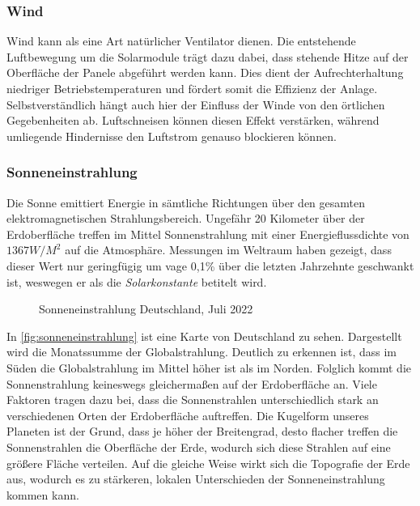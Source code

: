 \documentclass[12pt, a4paper]{article}
\begin{document}
\subsubsection{Wind}

Wind kann als eine Art natürlicher Ventilator dienen. Die entstehende Luftbewegung um die Solarmodule trägt dazu dabei, dass stehende Hitze auf der Oberfläche der Panele abgeführt werden kann. Dies dient der Aufrechterhaltung niedriger Betriebstemperaturen und fördert somit die Effizienz der Anlage. Selbstverständlich hängt auch hier der Einfluss der Winde von den örtlichen Gegebenheiten ab. Luftschneisen können diesen Effekt verstärken, während umliegende Hindernisse den Luftstrom genauso blockieren können.

\subsubsection{Sonneneinstrahlung}

Die Sonne emittiert Energie in sämtliche Richtungen über den gesamten elektromagnetischen Strahlungsbereich. Ungefähr 20 Kilometer über der Erdoberfläche treffen im Mittel Sonnenstrahlung mit einer Energieflussdichte von $1367 W/M^2$ auf die Atmosphäre. Messungen im Weltraum haben gezeigt, dass dieser Wert nur geringfügig um vage 0,1\% über die letzten Jahrzehnte geschwankt ist, weswegen er als die \textit{Solarkonstante} betitelt wird. 

\begin{figure}
\centering
\def\svgwidth{350pt}

\caption{Sonneneinstrahlung Deutschland, Juli 2022}
\label{fig:sonneneinstrahlung}
\end {figure}

In \autoref{fig:sonneneinstrahlung} ist eine Karte von Deutschland zu sehen. Dargestellt wird die Monatssumme der Globalstrahlung. Deutlich zu erkennen ist, dass im Süden die Globalstrahlung im Mittel höher ist als im Norden. Folglich kommt die Sonnenstrahlung keineswegs gleichermaßen auf der Erdoberfläche an. Viele Faktoren tragen dazu bei, dass die Sonnenstrahlen unterschiedlich stark an verschiedenen Orten der Erdoberfläche auftreffen. Die Kugelform unseres Planeten ist der Grund, dass je höher der Breitengrad, desto flacher treffen die Sonnenstrahlen die Oberfläche der Erde, wodurch sich diese Strahlen auf eine größere Fläche verteilen. Auf die gleiche Weise wirkt sich die Topografie der Erde aus, wodurch es zu stärkeren, lokalen Unterschieden der Sonneneinstrahlung kommen kann.
\end{document}
